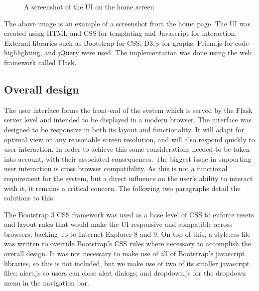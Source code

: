 \documentclass[11pt,a4paper]{article}
\begin{document}
\begin{figure}[h!]
  \caption{A screenshot of the UI on the home screen}
  \label{fig:uiscreenshot}
\end{figure}

The above image is an example of a screenshot from the home page. The UI was created using HTML and CSS for templating and Javascript for interaction. External libraries such as Bootstrap for CSS, D3.js for graphs, Prism.js for code highlighting, and jQuery were used. The implementation was done using the web framework called Flask.

\subsection{Overall design}

The user interface forms the front-end of the system which is served by the Flask server level and intended to be displayed in a modern browser. The interface was designed to be responsive in both its layout and functionality. It will adapt for optimal view on any reasonable screen resolution, and will also respond quickly to user interaction.  In order to achieve this some considerations needed to be taken into account, with their associated consequences. The biggest issue in supporting user interaction is cross browser compatibility. As this is not a functional requirement for the system, but a direct influence on the user’s ability to interact with it, it remains a critical concern. The following two paragraphs detail the solutions to this. 

The Bootstrap 3 CSS framework was used as a base level of CSS to enforce resets and layout rules that would make the UI responsive and compatible across browsers, backing up to Internet Explorer 8 and 9. On top of this, a style.css file was written to override Bootstrap’s CSS rules where necessary to accomplish the overall design. It was not necessary to make use of all of Bootstrap’s javascript libraries, so this is not included, but we make use of two of its smaller javascript files: alert.js so users can close alert dialogs; and dropdown.js for the dropdown menu in the navigation bar.
\end{document}
